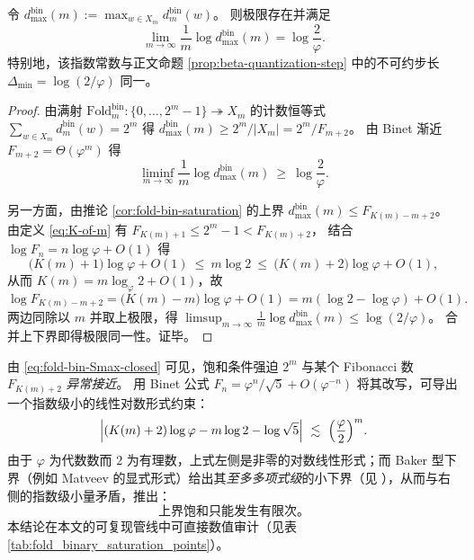 \begin{theorem}\label{thm:fold-bin-max-fiber-exponent}
令 \(d^{\mathrm{bin}}_{\max}(m):=\max_{w\in X_m} d^{\mathrm{bin}}_m(w)\)。
则极限存在并满足
\[
\lim_{m\to\infty}\frac{1}{m}\log d^{\mathrm{bin}}_{\max}(m)=\log\frac{2}{\varphi}.
\]
特别地，该指数常数与正文命题 \ref{prop:beta-quantization-step} 中的不可约步长 \(\Delta_{\min}=\log(2/\varphi)\) 同一。
\end{theorem}
\begin{proof}
由满射 \(\mathrm{Fold}^{\mathrm{bin}}_m:\{0,\dots,2^m-1\}\twoheadrightarrow X_m\) 的计数恒等式
\(
\sum_{w\in X_m} d^{\mathrm{bin}}_m(w)=2^m
\)
得
\(
d^{\mathrm{bin}}_{\max}(m)\ge 2^m/|X_m|
=2^m/F_{m+2}
\)。
由 Binet 渐近 \(F_{m+2}=\Theta(\varphi^{m})\) 得
\[
\liminf_{m\to\infty}\frac{1}{m}\log d^{\mathrm{bin}}_{\max}(m)\ \ge\ \log\frac{2}{\varphi}.
\]
\par
另一方面，由推论 \ref{cor:fold-bin-saturation} 的上界
\(
d^{\mathrm{bin}}_{\max}(m)\le F_{K(m)-m+2}
\)。
由定义 \eqref{eq:K-of-m} 有
\(
F_{K(m)+1}\le 2^m-1 < F_{K(m)+2}
\)，
结合 \(\log F_n=n\log\varphi+O(1)\) 得
\[
\bigl(K(m)+1\bigr)\log\varphi+O(1)\ \le\ m\log 2\ \le\ \bigl(K(m)+2\bigr)\log\varphi+O(1),
\]
从而 \(K(m)=m\log_{\varphi}2+O(1)\)，故
\[
\log F_{K(m)-m+2}=\bigl(K(m)-m\bigr)\log\varphi+O(1)
=m(\log 2-\log\varphi)+O(1).
\]
两边同除以 \(m\) 并取上极限，得
\(
\limsup_{m\to\infty}\frac{1}{m}\log d^{\mathrm{bin}}_{\max}(m)\le \log(2/\varphi)
\)。
合并上下界即得极限同一性。证毕。
\end{proof}

\begin{remark}\label{rem:fold-bin-finite}
由 \eqref{eq:fold-bin-Smax-closed} 可见，饱和条件强迫 \(2^m\) 与某个 Fibonacci 数 \(F_{K(m)+2}\) \emph{异常接近}。
用 Binet 公式 \(F_n=\varphi^n/\sqrt5+O(\varphi^{-n})\) 将其改写，可导出一个指数级小的线性对数形式约束：
\[
\Bigl|(K(m)+2)\log\varphi - m\log 2 - \log\sqrt5\Bigr|
\ \lesssim\ \Bigl(\frac{\varphi}{2}\Bigr)^m.
\]
由于 \(\varphi\) 为代数数而 \(2\) 为有理数，上式左侧是非零的对数线性形式；而 Baker 型下界（例如 Matveev 的显式形式）给出其\emph{至多多项式级}的小下界（见 \cite{Matveev2000LinearFormsLogs,BakerWustholz2007LogarithmicForms}），从而与右侧的指数级小量矛盾，推出：
\[
\text{上界饱和只能发生有限次。}
\]
本结论在本文的可复现管线中可直接数值审计（见表 \ref{tab:fold_binary_saturation_points}）。
\end{remark}

